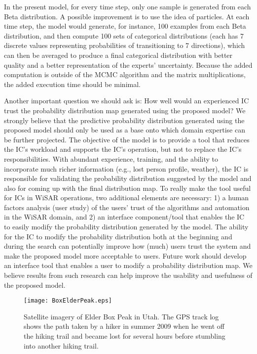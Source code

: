 In the present model, for every time step, only one sample is generated from each Beta distribution. A possible improvement is to use the idea of particles. At each time step, the model would generate, for instance, 100 examples from each Beta distribution, and then compute 100 sets of categorical distributions (each has 7 discrete values representing probabilities of transitioning to 7 directions), which can then be averaged to produce a final categorical distribution with better quality and a better representation of the experts' uncertainty. Because the added computation is outside of the MCMC algorithm and the matrix multiplications, the added execution time should be minimal.

Another important question we should ask is: How well would an experienced IC trust the probability distribution map generated using the proposed model? We strongly believe that the predictive probability distribution generated using the proposed model should only be used as a base onto which domain expertise can be further projected. The objective of the model is to provide a tool that reduces the IC's workload and supports the IC's operation, but not to replace the IC's responsibilities. With abundant experience, training, and the ability to incorporate much richer information (e.g., lost person profile, weather), the IC is responsible for validating the probability distribution suggested by the model and also for coming up with the final distribution map. To really make the tool useful for ICs in WiSAR operations, two additional elements are necessary: 1) a human factors analysis (user study) of the users' trust of the algorithms and automation in the WiSAR domain, and 2) an interface component/tool that enables the IC to easily modify the probability distribution generated by the model. The ability for the IC to modify the probability distribution both at the beginning and during the search can potentially improve how (much) users trust the system and make the proposed model more acceptable to users. Future work should develop an interface tool that enables a user to modify a probability distribution map. We believe results from such research can help improve the usability and usefulness of the proposed model.

\begin{figure}
\centering
\texttt{[image: BoxElderPeak.eps]}
\caption[Satellite imagery of Elder Box Peak in Utah]{Satellite imagery of Elder Box Peak in Utah. The GPS track log shows the path taken by a hiker in summer 2009 when he went off the hiking trail and became lost for several hours before stumbling into another hiking trail.}
\label{BoxElderPeak}
\end{figure}



